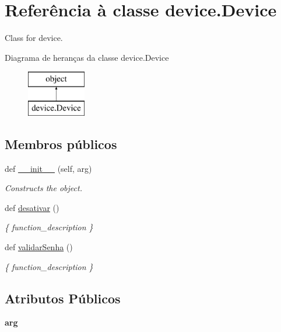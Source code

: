 \hypertarget{classdevice_1_1_device}{}\section{Referência à classe device.\+Device}
\label{classdevice_1_1_device}


Class for device.  


Diagrama de heranças da classe device.\+Device\begin{figure}[H]
\begin{center}
\leavevmode
\includegraphics[height=2.000000cm]{classdevice_1_1_device}
\end{center}
\end{figure}
\subsection*{Membros públicos}
\begin{DoxyCompactItemize}
\item 
def \hyperlink{classdevice_1_1_device_a6ed267a3bacc28a17a6dc910167b1ca2}{\+\_\+\+\_\+init\+\_\+\+\_\+} (self, arg)
\begin{DoxyCompactList}\small\item\em Constructs the object. \end{DoxyCompactList}\item 
def \hyperlink{classdevice_1_1_device_a46b3c76c75ad8a9d553f751a2086f7d6}{desativar} ()
\begin{DoxyCompactList}\small\item\em \{ function\+\_\+description \} \end{DoxyCompactList}\item 
def \hyperlink{classdevice_1_1_device_afe65617fbdfe35b5ec90b33e36a0a0d3}{validar\+Senha} ()
\begin{DoxyCompactList}\small\item\em \{ function\+\_\+description \} \end{DoxyCompactList}\end{DoxyCompactItemize}
\subsection*{Atributos Públicos}
\begin{DoxyCompactItemize}
\item 
{\bfseries arg}\hypertarget{classdevice_1_1_device_a0dca5f5fca68b9e9c63e238fbc21c84d}{}\label{classdevice_1_1_device_a0dca5f5fca68b9e9c63e238fbc21c84d}

\end{DoxyCompactItemize}


